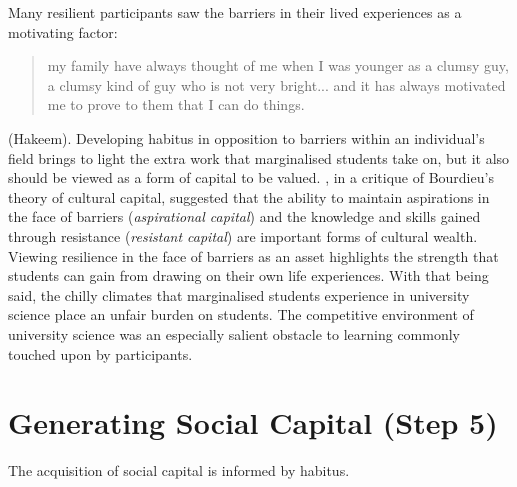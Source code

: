 Many resilient participants saw the barriers in their lived experiences as a motivating factor: 
\blockquote{my family have always thought of me when I was younger as a clumsy guy, a clumsy kind of guy who is not very bright... and it has always motivated me to prove to them that I can do things.} (Hakeem).  Developing habitus in opposition to barriers within an individual's field brings to light the extra work that marginalised students take on, but it also should be viewed as a form of capital to be valued. \cite{yosso2005whose}, in a critique of Bourdieu's theory of cultural capital, suggested that the ability to maintain aspirations in the face of barriers (\textit{aspirational capital}) and the knowledge and skills gained through resistance (\textit{resistant capital}) are important forms of cultural wealth. Viewing resilience in the face of barriers as an asset highlights the strength that students can gain from drawing on their own life experiences. With that being said, the chilly climates \citep{Blickenstaff_2005} that marginalised students experience in university science place an unfair burden on students. The competitive environment of university science was an especially salient obstacle to learning commonly touched upon by participants.



\section{Generating Social Capital (Step 5)}
The acquisition of social capital is informed by habitus. 

